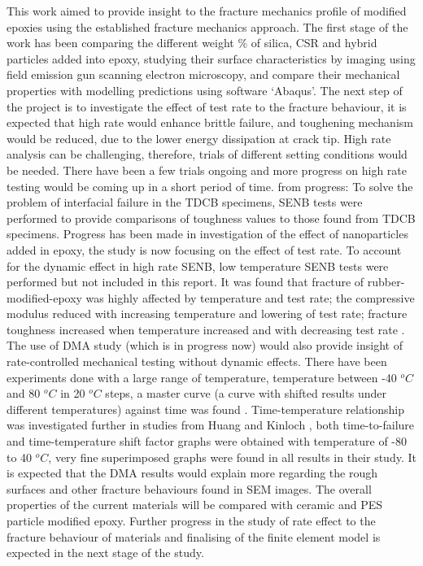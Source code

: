 \documentclass[numbers=noendperiod,chapterprefix=on]{icldt} %
\begin{document}
This work aimed to provide insight to the fracture mechanics profile of modified epoxies using the established fracture mechanics approach. The first stage of the work has been comparing the different weight \% of silica, CSR and hybrid particles added into epoxy, studying their surface characteristics by imaging using field emission gun scanning electron microscopy, and compare their mechanical properties with modelling predictions using software ‘Abaqus'.
The next step of the project is to investigate the effect of test rate to the fracture behaviour, it is expected that high rate would enhance brittle failure, and toughening mechanism would be reduced, due to the lower energy dissipation at crack tip. High rate analysis can be challenging, therefore, trials of different setting conditions would be needed. There have been a few trials ongoing and more progress on high rate testing would be coming up in a short period of time.
from progress:
To solve the problem of interfacial failure in the TDCB specimens, SENB tests were performed to provide comparisons of toughness values to those found from TDCB specimens. Progress has been made in investigation of the effect of nanoparticles added in epoxy, the study is now focusing on the effect of test rate. 
To account for the dynamic effect in high rate SENB, low temperature SENB tests were performed but not included in this report. It was found that fracture of rubber-modified-epoxy was highly affected by temperature and test rate; the compressive modulus reduced with increasing temperature and lowering of test rate; fracture toughness increased when temperature increased and with decreasing test rate \cite{Brett2011}. 
The use of DMA study (which is in progress now) would also provide insight of rate-controlled mechanical testing without dynamic effects. There have been experiments done with a large range of temperature, temperature between -40 $^oC$ and 80 $^oC$ in 20 $^oC$ steps, a master curve (a curve with shifted results under different temperatures) against time was found \cite{Brett2011}. Time-temperature relationship was investigated further in studies from Huang and Kinloch \cite{Meschut2013}, both time-to-failure and time-temperature shift factor graphs were obtained with temperature of -80 to 40 $^oC$, very fine superimposed graphs were found in all results in their study. It is expected that the DMA results would explain more regarding the rough surfaces and other fracture behaviours found in SEM images.
The overall properties of the current materials will be compared with ceramic and PES particle modified epoxy. Further progress in the study of rate effect to the fracture behaviour of materials and finalising of the finite element model is expected in the next stage of the study. 
\end{document}
